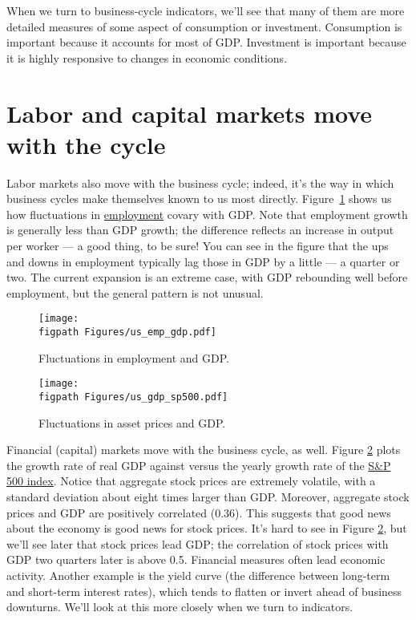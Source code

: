 When we turn to 
business-cycle indicators, we'll see that
many of them are more detailed measures of
some aspect of consumption or investment.
Consumption is important because it accounts for most of GDP.
Investment is important because it is highly responsive
to changes in economic conditions.


\section{Labor and capital markets move with the cycle}

Labor markets also move with the business cycle;
indeed, it's the way in which business cycles make themselves
known to us most directly.
Figure~\ref{fig:labor} shows us how fluctuations in
\href{http://research.stlouisfed.org/fred2/series/PAYEMS}{employment}
covary with GDP.
Note that employment growth is generally less than GDP growth;
the difference reflects an increase in output per worker --- a good thing, to be sure!
You can see in the figure that the ups and downs in employment
typically lag those in GDP by a little --- a quarter or two.
The current expansion is an extreme case, with
GDP rebounding well before employment,
but the general pattern is not unusual.

\begin{figure}[h!]
\caption{Fluctuations in employment and GDP.}
    \label{fig:labor}%
    \centering
    \texttt{[image: \\figpath Figures/us\_emp\_gdp.pdf]}
\end{figure}

\begin{figure}[h!]
    \caption{Fluctuations in asset prices and GDP.}
    \label{fig:stock}%
    \centering
    \texttt{[image: \\figpath Figures/us\_gdp\_sp500.pdf]}
\end{figure}

Financial (capital) markets move with the business cycle, as well. Figure \ref{fig:stock} plots the growth rate of real GDP against versus the yearly growth rate of the \href{http://research.stlouisfed.org/fred2/series/SP500}{S\&P 500 index}. Notice that aggregate stock prices are extremely volatile, with a standard deviation about eight times larger than GDP. Moreover, aggregate stock prices and GDP are positively correlated (0.36). This suggests that good news about the economy is good news for stock prices.
It's hard to see in Figure \ref{fig:stock},
but we'll see later that stock prices lead GDP;
the correlation of stock prices with GDP two quarters later is above 0.5. Financial
measures often lead economic activity. Another example is the yield 
 curve (the difference
between long-term and short-term interest rates),
which tends to flatten or invert ahead of business downturns.
We'll look at this more closely when we turn to indicators.


